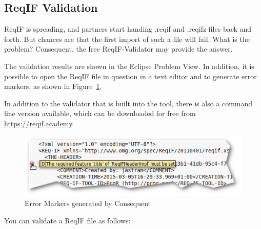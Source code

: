\subsection{ReqIF Validation}
\label{sec:reqif-validation}

ReqIF is spreading, and partners start handing .reqif and .reqifz files back and forth.  But chances are that the first import of such a file will fail.  What is the problem? Consequent, the free ReqIF-Validator may provide the answer.

The validation results are shown in the Eclipse Problem View.  In addition, it is possible to open the ReqIF file in question in a text editor and to generate error markers, as shown in Figure~\ref{fig:error-marker}.

\begin{info}
In addition to the validator that is built into the tool, there is also a command line version available, which can be downloaded for free from \url{https://reqif.academy}.
\end{info}

\begin{figure}
\centering     
\includegraphics[width=\linewidth]{../rmf-images/error-marker.png}
\caption{Error Markers generated by Consequent}
\label{fig:error-marker}
\end{figure}

You can validate a ReqIF file as follows:

